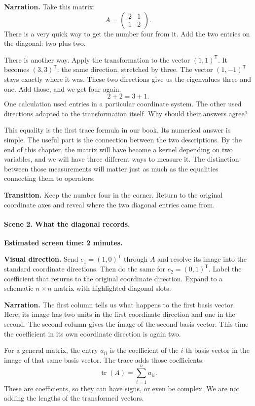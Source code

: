 \textbf{Narration.} Take this matrix:
\[
A=\begin{pmatrix}2&1\\1&2\end{pmatrix}.
\]
There is a very quick way to get the number four from it. Add the two entries on the diagonal: two plus two.

There is another way. Apply the transformation to the vector $(1,1)^{\mathsf{T}}$. It becomes $(3,3)^{\mathsf{T}}$: the same direction, stretched by three. The vector $(1,-1)^{\mathsf{T}}$ stays exactly where it was. These two directions give us the eigenvalues three and one. Add those, and we get four again.
\[
2+2=3+1.
\]
One calculation used entries in a particular coordinate system. The other used directions adapted to the transformation itself. Why should their answers agree?

This equality is the first trace formula in our book. Its numerical answer is simple. The useful part is the connection between the two descriptions. By the end of this chapter, the matrix will have become a kernel depending on two variables, and we will have three different ways to measure it. The distinction between those measurements will matter just as much as the equalities connecting them to operators.

\textbf{Transition.} Keep the number four in the corner. Return to the original coordinate axes and reveal where the two diagonal entries came from.

\paragraph{Scene 2. What the diagonal records.}
\textbf{Estimated screen time: 2 minutes.}

\textbf{Visual direction.} Send $e_1=(1,0)^{\mathsf{T}}$ through $A$ and resolve its image into the standard coordinate directions. Then do the same for $e_2=(0,1)^{\mathsf{T}}$. Label the coefficient that returns to the original coordinate direction. Expand to a schematic $n\times n$ matrix with highlighted diagonal slots.

\textbf{Narration.} The first column tells us what happens to the first basis vector. Here, its image has two units in the first coordinate direction and one in the second. The second column gives the image of the second basis vector. This time the coefficient in its own coordinate direction is again two.

For a general matrix, the entry $a_{ii}$ is the coefficient of the $i$-th basis vector in the image of that same basis vector. The trace adds those coefficients:
\[
\operatorname{tr}(A)=\sum_{i=1}^n a_{ii}.
\]
These are coefficients, so they can have signs, or even be complex. We are not adding the lengths of the transformed vectors.

